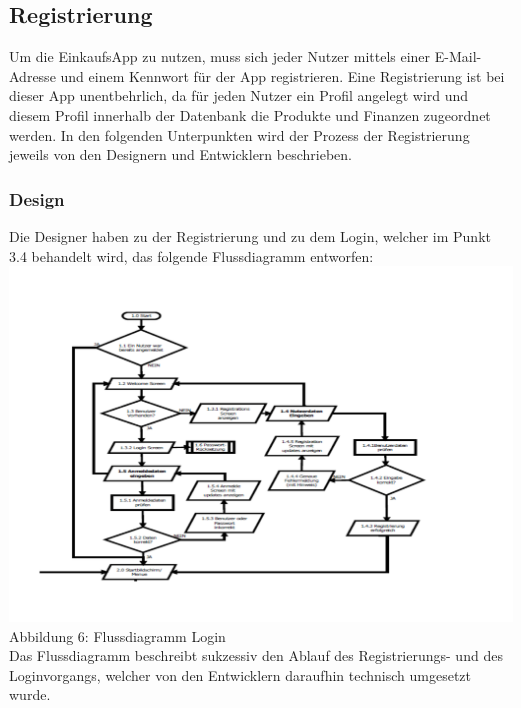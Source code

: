 \documentclass[12pt,a4paper]{article}
\begin{document}
\subsection{Registrierung}
Um die EinkaufsApp zu nutzen, muss sich jeder Nutzer mittels einer E-Mail-Adresse und einem Kennwort für der App registrieren.
Eine Registrierung ist bei dieser App unentbehrlich, da für jeden Nutzer ein Profil angelegt wird und diesem Profil innerhalb der Datenbank die Produkte und Finanzen zugeordnet werden.
In den folgenden Unterpunkten wird der Prozess der Registrierung jeweils von den Designern und Entwicklern beschrieben.
\subsubsection*{Design}
Die Designer haben zu der Registrierung und zu dem Login, welcher im Punkt 3.4 behandelt wird, das folgende Flussdiagramm entworfen:
\\
\hspace*{-10mm} \includegraphics[trim = 17mm 0mm 0mm 20mm, clip, scale=0.8]{Login-PDF.pdf}
\footnotesize Abbildung 6: Flussdiagramm Login
\normalsize
\\
\linebreak
Das Flussdiagramm beschreibt sukzessiv den Ablauf des Registrierungs- und des Loginvorgangs, welcher von den Entwicklern daraufhin technisch umgesetzt wurde.
\end{document}
